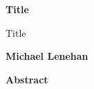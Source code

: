 \thispagestyle{plain}
\begin{center}
    \Large
    \textbf{Title}

    \vspace{0.4cm}
    \large
    Title

    \vspace{0.4cm}
    \textbf{Michael Lenehan}

    \vspace{0.9cm}
    \textbf{Abstract}

\end{center}

\par

\pagebreak

